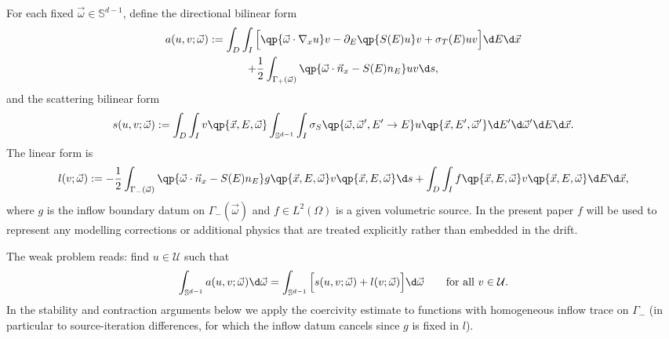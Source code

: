 \documentclass[final]{amsart}
\begin{document}
For each fixed $\vec{\omega} \in \mathbb{S}^{d-1}$, define the
directional bilinear form
\begin{multline}
  \label{eq:aform}
  a(u,v;\vec{\omega})
  :=
  \int_D \int_I
  \Big[
    \qp{\vec{\omega}\cdot\nabla_x u}  v
    -
    \partial_E\qp{S(E)u}  v
    +
    \sigma_T(E) u v
  \Big] \d E \d\vec{x}
  \\
  + \frac{1}{2}
  \int_{\Gamma_+(\vec{\omega})}
  \qp{\vec{\omega}\cdot\vec{n}_x - S(E) n_E} u v  \d s,
\end{multline}
and the scattering bilinear form
\begin{equation}
  \label{eq:sform}
  s(u,v;\vec{\omega})
  :=
  \int_D \int_I
  v\qp{\vec{x},E,\vec{\omega}}
  \int_{\mathbb{S}^{d-1}} \int_I
  \sigma_S\qp{\vec{\omega},\vec{\omega}',E' \to E} 
  u\qp{\vec{x},E',\vec{\omega}'}  \d E' \d\vec{\omega}'
   \d E \d\vec{x}.
\end{equation}
The linear form is
\begin{equation}
  \label{eq:lform}
  l(v;\vec{\omega})
  :=
  -\frac{1}{2}
  \int_{\Gamma_-(\vec{\omega})}
  \qp{\vec{\omega}\cdot\vec{n}_x - S(E) n_E} 
  g\qp{\vec{x},E,\vec{\omega}}  v\qp{\vec{x},E,\vec{\omega}}  \d s
  +
  \int_D \int_I
  f\qp{\vec{x},E,\vec{\omega}}  v\qp{\vec{x},E,\vec{\omega}}
   \d E \d\vec{x},
\end{equation}
where $g$ is the inflow boundary datum on $\Gamma_-(\vec{\omega})$ and
$f \in L^2(\Omega)$ is a given volumetric source. In the present paper
$f$ will be used to represent any modelling corrections or additional
physics that are treated explicitly rather than embedded in the drift.

The weak problem reads: find $u \in \mathcal{U}$ such that
\begin{equation}
  \label{eq:weak}
  \int_{\mathbb{S}^{d-1}} a(u,v;\vec{\omega}) \d\vec{\omega}
  =
  \int_{\mathbb{S}^{d-1}}
  \Big[ s(u,v;\vec{\omega}) + l(v;\vec{\omega}) \Big] \d\vec{\omega}
  \qquad \text{for all } v \in \mathcal{U}.
\end{equation}
In the stability and contraction arguments below we apply the coercivity
estimate to functions with homogeneous inflow trace on $\Gamma_-$ (in
particular to source-iteration differences, for which the inflow datum
cancels since $g$ is fixed in $l$).
\end{document}
